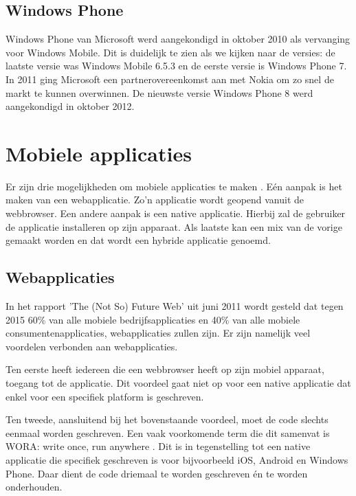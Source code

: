 \subsection{Windows Phone}
Windows Phone van Microsoft werd aangekondigd in oktober 2010 als vervanging voor Windows Mobile. Dit is duidelijk te zien als we kijken naar de versies: de laatste versie was Windows Mobile 6.5.3 en de eerste versie is Windows Phone 7. In 2011 ging Microsoft een partnerovereenkomst aan met Nokia om zo snel de markt te kunnen overwinnen. De nieuwste versie Windows Phone 8 werd aangekondigd in oktober 2012. 


\section{Mobiele applicaties}
\label{sec:mobiele-applicaties}
Er zijn drie mogelijkheden om mobiele applicaties te maken \cite{Accenture2012,Hales2012}. Eén aanpak is het maken van een webapplicatie. Zo'n applicatie wordt geopend vanuit de webbrowser. Een andere aanpak is een native applicatie. Hierbij zal de gebruiker de applicatie installeren op zijn apparaat. Als laatste kan een mix van de vorige gemaakt worden en dat wordt een hybride applicatie genoemd.

\subsection{Webapplicaties}
In het rapport 'The (Not So) Future Web' \cite{Phifer2011} uit juni 2011 wordt gesteld dat tegen 2015 60\% van alle mobiele bedrijfsapplicaties en 40\% van alle mobiele consumentenapplicaties, webapplicaties zullen zijn. Er zijn namelijk veel voordelen \cite{Accenture2012} verbonden aan webapplicaties.

Ten eerste heeft iedereen die een webbrowser heeft op zijn mobiel apparaat, toegang tot de applicatie.  Dit voordeel gaat niet op voor een native applicatie dat enkel voor een specifiek platform is geschreven. 

Ten tweede, aansluitend bij het bovenstaande voordeel, moet de code slechts eenmaal worden geschreven. Een vaak voorkomende term die dit samenvat is WORA: write once, run anywhere \cite{Hales2012}. Dit is in tegenstelling tot een native applicatie die specifiek geschreven is voor bijvoorbeeld iOS, Android en Windows Phone. Daar dient de code driemaal te worden geschreven \'en te worden onderhouden.

